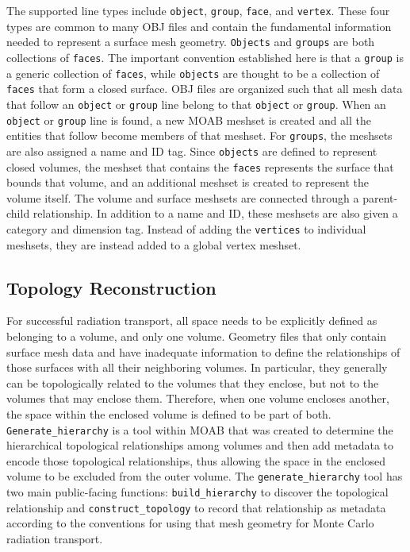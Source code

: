 \documentclass{anstrans}
\begin{document}
The supported line types include \texttt{object}, \texttt{group},
\texttt{face}, and \texttt{vertex}.  These four types are common to many OBJ
files and contain the fundamental information needed to represent a surface
mesh geometry.  \texttt{Objects} and \texttt{groups} are both collections of
\texttt{faces}.  The important convention established here is that a
\texttt{group} is a generic collection of \texttt{faces}, while
\texttt{objects} are thought to be a collection of \texttt{faces} that form a
closed surface.  OBJ files are organized such that all mesh data that follow
an \texttt{object} or \texttt{group} line belong to that \texttt{object} or
\texttt{group}.  When an \texttt{object} or \texttt{group} line is found, a
new MOAB meshset is created and all the entities that follow become members of
that meshset.  For \texttt{groups}, the meshsets are also assigned a name and
ID tag.  Since \texttt{objects} are defined to represent closed volumes, the
meshset that contains the \texttt{faces} represents the surface that bounds
that volume, and an additional meshset is created to represent the volume
itself.  The volume and surface meshsets are connected through a parent-child
relationship.  In addition to a name and ID, these meshsets are also given a
category and dimension tag.  Instead of adding the \texttt{vertices} to individual
meshsets, they are instead added to a global vertex meshset.

\subsection{Topology Reconstruction}
For successful radiation transport, all space needs to be explicitly defined
as belonging to a volume, and only one volume.  Geometry files that only
contain surface mesh data and have inadequate information to define the
relationships of those surfaces with all their neighboring volumes.  In
particular, they generally can be topologically related to the volumes that
they enclose, but not to the volumes that may enclose them.  Therefore, when
one volume encloses another, the space within the enclosed volume is defined
to be part of both. \texttt{Generate\_hierarchy} is a tool within MOAB
\cite{genhi} that was created to determine the hierarchical topological
relationships among volumes and then add metadata to encode those topological
relationships, thus allowing the space in the enclosed volume to be excluded
from the outer volume.  The \texttt{generate\_hierarchy} tool has two main
public-facing functions: \texttt{build\_hierarchy} to discover the topological
relationship and \texttt{construct\_topology} to record that relationship as
metadata according to the conventions for using that mesh geometry for Monte
Carlo radiation transport.
\end{document}
